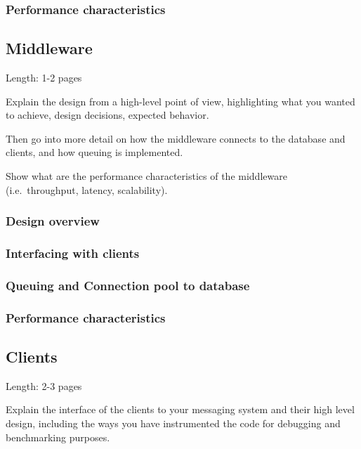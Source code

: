 \documentclass[11pt]{article}
\begin{document}
\subsubsection{Performance characteristics}\label{sec:performance-characteristics}

\subsection{Middleware}\label{sec:middleware}

Length: 1-2 pages

Explain the design from a high-level point of view, highlighting what
you wanted to achieve, design decisions, expected behavior.

Then go into more detail on how the middleware connects to the database
and clients, and how queuing is implemented.

Show what are the performance characteristics of the middleware
(i.e.~throughput, latency, scalability).

\subsubsection{Design overview}\label{sec:design-overview}

\subsubsection{Interfacing with clients}\label{sec:interfacing-with-clients}

\subsubsection{Queuing and Connection pool to database}\label{sec:queuing-and-connection-pool-to-database}

\subsubsection{Performance characteristics}\label{sec:performance-characteristics-1}

\subsection{Clients}\label{sec:clients}

Length: 2-3 pages

Explain the interface of the clients to your messaging system and their
high level design, including the ways you have instrumented the code for
debugging and benchmarking purposes.
\end{document}
